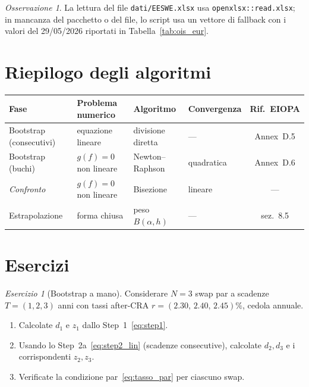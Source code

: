 \documentclass[11pt,a4paper]{article}
\theoremstyle{plain}
\theoremstyle{definition}
\theoremstyle{remark}
\newtheorem*{osservazione}{Osservazione}
\newtheorem{esercizio}{Esercizio}[section]
\begin{document}
\begin{osservazione}
La lettura del file \texttt{dati/EESWE.xlsx} usa \texttt{openxlsx::read.xlsx}; in
mancanza del pacchetto o del file, lo script usa un vettore di fallback con i valori del
29/05/2026 riportati in Tabella~\ref{tab:ois_eur}.
\end{osservazione}

\section*{Riepilogo degli algoritmi}

\begin{center}\small
\renewcommand{\arraystretch}{1.35}
\begin{tabular}{llllc}
\toprule
\textbf{Fase} & \textbf{Problema numerico} & \textbf{Algoritmo} & \textbf{Convergenza} & \textbf{Rif.\ EIOPA}\\
\midrule
Bootstrap (consecutivi) & equazione lineare & divisione diretta & --- & Annex~D.5\\
Bootstrap (buchi) & $g(f)=0$ non lineare & Newton--Raphson & quadratica & Annex~D.6\\
\emph{Confronto} & $g(f)=0$ non lineare & Bisezione & lineare & ---\\
Estrapolazione & forma chiusa & peso $B(\alpha,h)$ & --- & sez.~8.5\\
\bottomrule
\end{tabular}
\end{center}

\section{Esercizi}
\label{sec:esercizi}

\begin{esercizio}[Bootstrap a mano]
Considerare $N=3$ swap par a scadenze $T=(1,2,3)$ anni con tassi after-CRA
$r=(2.30,\,2.40,\,2.45)\%$, cedola annuale.
\begin{enumerate}[label=(\alph*)]
  \item Calcolate $d_1$ e $z_1$ dallo Step~1~\eqref{eq:step1}.
  \item Usando lo Step~2a~\eqref{eq:step2_lin} (scadenze consecutive), calcolate
        $d_2, d_3$ e i corrispondenti $z_2, z_3$.
  \item Verificate la condizione par~\eqref{eq:tasso_par} per ciascuno swap.
\end{enumerate}
\end{esercizio}
\end{document}

